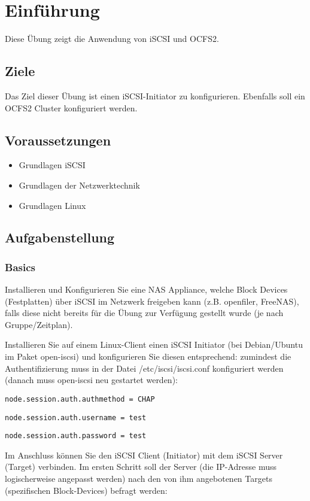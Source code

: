 
\section{Einführung}
Diese Übung zeigt die Anwendung von iSCSI und OCFS2.

\subsection{Ziele}
Das Ziel dieser Übung ist einen iSCSI-Initiator zu konfigurieren. Ebenfalls soll ein OCFS2 Cluster konfiguriert werden. 

\subsection{Voraussetzungen}
\begin{itemize}
	\item Grundlagen iSCSI
	\item Grundlagen der Netzwerktechnik
	\item Grundlagen Linux

\end{itemize}
\subsection{Aufgabenstellung}
\subsubsection{Basics}
Installieren und Konfigurieren Sie eine NAS Appliance, welche Block Devices (Festplatten) über iSCSI im Netzwerk freigeben kann (z.B. openfiler, FreeNAS), falls diese nicht bereits für die Übung zur Verfügung gestellt wurde (je nach Gruppe/Zeitplan).

Installieren Sie auf einem Linux-Client einen iSCSI Initiator (bei Debian/Ubuntu im Paket open-iscsi) und konfigurieren Sie diesen entsprechend: zumindest die Authentifizierung muss in der Datei /etc/iscsi/iscsi.conf konfiguriert werden (danach muss open-iscsi neu gestartet werden):

\texttt{node.session.auth.authmethod = CHAP}

\texttt{node.session.auth.username = test}

\texttt{node.session.auth.password = test}

Im Anschluss können Sie den iSCSI Client (Initiator) mit dem iSCSI Server (Target) verbinden. Im ersten Schritt soll der Server (die IP-Adresse muss logischerweise angepasst werden) nach den von ihm angebotenen Targets (spezifischen Block-Devices) befragt werden:

